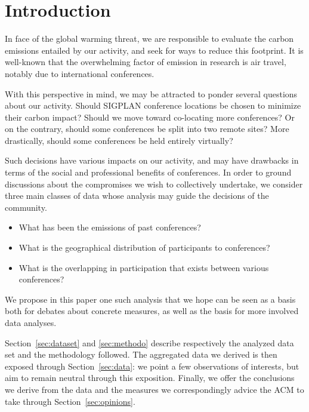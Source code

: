 \section{Introduction}

In face of the global warming threat, we are responsible to evaluate the carbon
emissions entailed by our activity, and seek for ways to reduce this footprint.
It is well-known that the overwhelming factor of emission in research is air travel,
notably due to international conferences.

With this perspective in mind, we may be attracted to ponder several questions
about our activity. Should SIGPLAN conference locations be chosen to minimize
their carbon impact? Should we move toward co-locating more conferences? Or on
the contrary, should some conferences be split into two remote sites?
More drastically, should some conferences be held entirely virtually?

Such decisions have various impacts on our activity, and may have drawbacks in
terms of the social and professional benefits of conferences. 
In order to ground discussions about the compromises we wish to collectively undertake, we consider
three main classes of data whose analysis may guide the decisions of the community.
\begin{itemize}
\item What has been the emissions of past conferences?
\item What is the geographical distribution of participants to conferences?
\item What is the overlapping in participation that exists between various conferences?
\end{itemize}

We propose in this paper one such analysis that we hope can be seen as a basis both for
debates about concrete measures, as well as the basis for more involved data analyses.

Section~\ref{sec:dataset} and
\ref{sec:methodo} describe respectively the analyzed data set and the
methodology followed. The aggregated data we derived is then exposed through
Section~\ref{sec:data}: we point a few observations of interests, but aim to
remain neutral through this exposition.  Finally, we offer the conclusions
we derive from the data and the measures we correspondingly advice the ACM
to take through Section~\ref{sec:opinions}.

